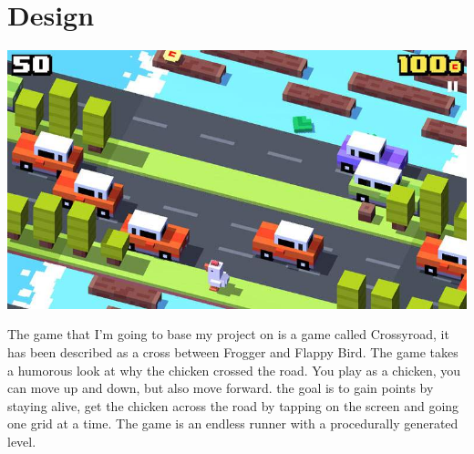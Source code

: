 \documentclass{article}
\begin{document}
\section{Design}

\begin{minipage}{0.4\textwidth}
\includegraphics[width=\linewidth]{crossyroad}
\end{minipage} \hfill
\begin{minipage}{0.55\textwidth}\raggedright
The game that I'm going to base my project on is a game called Crossyroad, it has been described as a cross between Frogger and Flappy Bird. The game takes a humorous look at why the chicken crossed the road. You play as a chicken, you can move up and down, but also move forward. the goal is to gain points by staying alive, get the chicken across the road by tapping on the screen and going one grid at a time. The game is an endless runner with a procedurally generated level.
\end{minipage} \newline
\end{document}
